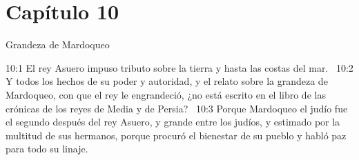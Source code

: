 \section*{Capítulo 10}
Grandeza de Mardoqueo  

10:1 El rey Asuero impuso tributo sobre la tierra y hasta las costas del mar.  
10:2 Y todos los hechos de su poder y autoridad, y el relato sobre la grandeza de Mardoqueo, con que el rey le engrandeció, ¿no está escrito en el libro de las crónicas de los reyes de Media y de Persia?  
10:3 Porque Mardoqueo el judío fue el segundo después del rey Asuero, y grande entre los judíos, y estimado por la multitud de sus hermanos, porque procuró el bienestar de su pueblo y habló paz para todo su linaje.
